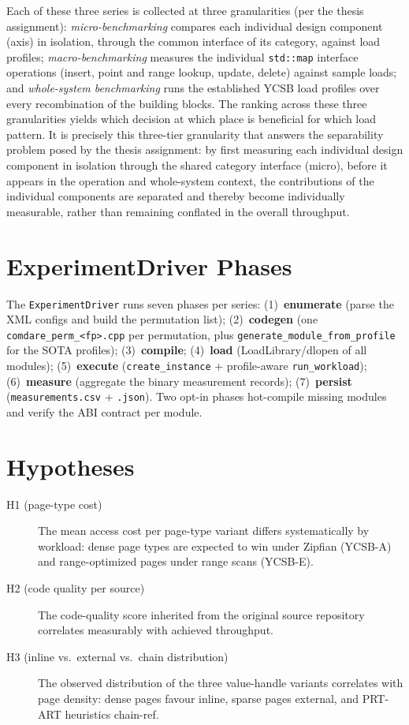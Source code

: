Each of these three series is collected at three granularities (per the thesis assignment):
\emph{micro-benchmarking} compares each individual design component (axis) in isolation, through the
common interface of its category, against load profiles; \emph{macro-benchmarking} measures the
individual \texttt{std::map} interface operations (insert, point and range lookup, update, delete)
against sample loads; and \emph{whole-system benchmarking} runs the established YCSB load profiles
over every recombination of the building blocks. The ranking across these three granularities yields
which decision at which place is beneficial for which load pattern. It is precisely this three-tier
granularity that answers the separability problem posed by the thesis assignment: by first measuring
each individual design component in isolation through the shared category interface (micro), before
it appears in the operation and whole-system context, the contributions of the individual components
are separated and thereby become individually measurable, rather than remaining conflated in the
overall throughput.

\section{ExperimentDriver Phases}\label{sec:experimentdriver}

The \texttt{ExperimentDriver} runs seven phases per series: (1)~\textbf{enumerate} (parse the XML
configs and build the permutation list); (2)~\textbf{codegen} (one \texttt{comdare\_perm\_<fp>.cpp}
per permutation, plus \texttt{generate\_module\_from\_profile} for the SOTA profiles);
(3)~\textbf{compile}; (4)~\textbf{load} (LoadLibrary/dlopen of all modules); (5)~\textbf{execute}
(\texttt{create\_instance} + profile-aware \texttt{run\_workload}); (6)~\textbf{measure} (aggregate
the binary measurement records); (7)~\textbf{persist} (\texttt{measurements.csv} + \texttt{.json}).
Two opt-in phases hot-compile missing modules and verify the ABI contract per module.

\section{Hypotheses}\label{sec:hypotheses}

\begin{description}
  \item[H1 (page-type cost)] The mean access cost per page-type variant differs systematically by
  workload: dense page types are expected to win under Zipfian (YCSB-A) and range-optimized pages
  under range scans (YCSB-E).
  \item[H2 (code quality per source)] The code-quality score inherited from the original source
  repository correlates measurably with achieved throughput.
  \item[H3 (inline vs.\ external vs.\ chain distribution)] The observed distribution of the three
  value-handle variants correlates with page density: dense pages favour inline, sparse pages
  external, and PRT-ART heuristics chain-ref.
\end{description}

